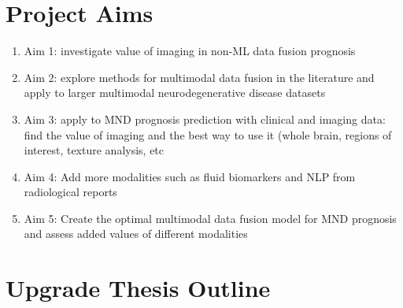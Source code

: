 \section{Project Aims}

\begin{enumerate}
    \item Aim 1: investigate value of imaging in non-ML data fusion prognosis
    \item Aim 2: explore methods for multimodal data fusion in the literature and apply to larger multimodal neurodegenerative disease datasets
    \item Aim 3: apply to MND prognosis prediction with clinical and imaging data: find the value of imaging and the best way to use it (whole brain, regions of interest, texture analysis, etc
    \item Aim 4: Add more modalities such as fluid biomarkers and NLP from radiological reports
    \item Aim 5: Create the optimal multimodal data fusion model for MND prognosis and assess added values of different modalities
\end{enumerate}

\section{Upgrade Thesis Outline}